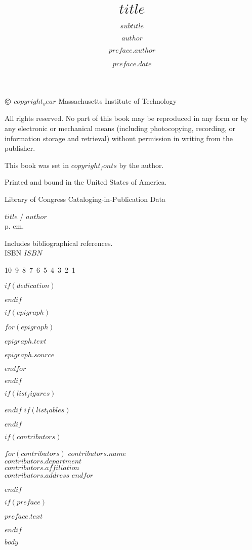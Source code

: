 \documentclass[$class_options$]{newmath}
\title{$title$}
\subtitle{$subtitle$}
\author{$author$}
\begin{document}
\halftitlepage

\titlepage

\begin{copyrightpage}

	\(\copyright\) $copyright_year$ Massachusetts Institute of Technology

	All rights reserved. No part of this book may be reproduced in
        any form or by any electronic or mechanical means (including
        photocopying, recording, or information storage and retrieval) without
        permission in writing from the publisher.

	This book was set in $copyright_fonts$ by the author.

	Printed and bound in the United States of America.

	Library of Congress Cataloging-in-Publication Data

	$title$ / $author$\\
	\hspace*{6pt} p. cm.

	Includes bibliographical references.\\
	ISBN $ISBN$
\vfill

10\ 9\ 8\ 7\ 6\ 5\ 4\ 3\ 2\ 1\

\end{copyrightpage}

$if(dedication)$
  \dedication{$dedication$}
$endif$

$if(epigraph)$
  \begin{epigraphpage}
  $for(epigraph)$
    \epigraph{$epigraph.text$}{$epigraph.source$}
  $endfor$
  \end{epigraphpage}
$endif$

\tableofcontents
$if(list_figures)$\listoffigures$endif$
$if(list_tables)$\listoftables$endif$

$if(contributors)$
  \begin{contributors}
  $for(contributors)$
    \contrib
    $contributors.name$\\
    $contributors.department$\\
    $contributors.affiliation$\\
    $contributors.address$
  $endfor$
  \end{contributors}
$endif$

$if(preface)$
\begin{preface}
  $preface.text$
  \author{$preface.author$}
  \date{$preface.date$}
\end{preface}
$endif$

$body$

\endmatter



\end{document}
